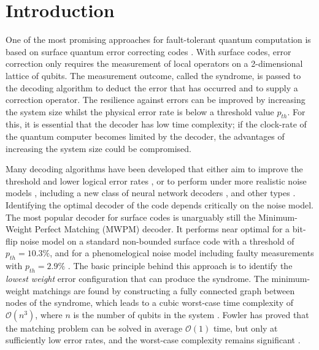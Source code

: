 \section{Introduction}\label{sec:introduction}
One of the most promising approaches for fault-tolerant quantum computation is based on surface quantum error correcting codes \cite{dennis2002topological, kitaev2003fault}. With surface codes, error correction only requires the measurement of local operators on a 2-dimensional lattice of qubits. The measurement outcome, called the syndrome, is passed to the decoding algorithm to deduct the error that has occurred and to supply a correction operator. The resilience against errors can be improved by increasing the system size whilst the physical error rate is below a threshold value $p_{th}$. For this, it is essential that the decoder has low time complexity; if the clock-rate of the quantum computer becomes limited by the decoder, the advantages of increasing the system size could be compromised.

Many decoding algorithms have been developed that either aim to improve the threshold and lower logical error rates \cites{wang2003confinement, raussendorf2007faulttolerant, fowler2012towards, fowler2013minimum, heim2016optimal, duclos2010fast, duclos2013fault, bravyi2014efficient, darmawan2018linear}, or to perform under more realistic noise models \cites{tuckett2020fault, hutter2015improved, bravyi2013quantum,  nickerson2019analysing, wootton2012high, huang2020fault}, including a new class of neural network decoders \cites{baireuther2019neural, chamberland2018deep, liu2019neural, nautrup2019optimizing, torlai2017neural, varsamopoulos2017decoding, varsamopoulos2020decoding}, and other types \cites{bombin2012universal, herold2015cellular, horsman2012surface, kubica2019cellular, watson2015fast}. Identifying the optimal decoder of the code depends critically on the noise model. The most popular decoder for surface codes is unarguably still the Minimum-Weight Perfect Matching (MWPM) decoder. It performs near optimal for a bit-flip noise model \cite{dennis2002topological} on a standard non-bounded surface code with a threshold of $p_{th} = 10.3\%$, and for a phenomelogical noise model including faulty measurements \cite{wang2003confinement} with $p_{th} = 2.9\%$ . The basic principle behind this approach is to identify the \emph{lowest weight} error configuration that can produce the syndrome. The minimum-weight matchings are found by constructing a fully connected graph between nodes of the syndrome, which leads to a cubic worst-case time complexity of $\mathcal{O}(n^3)$, where $n$ is the number of qubits in the system \cite{kolmogorov2009blossom}. Fowler has proved that the matching problem can be solved in average $\mathcal{O}(1)$ time, but only at sufficiently low error rates, and the worst-case complexity remains significant \cite{fowler2013minimum}. 

